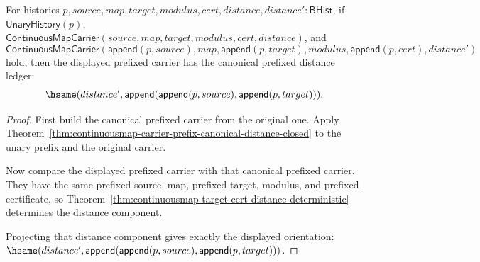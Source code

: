 \begin{theorem}
\label{thm:continuousmap-prefix-canonical-distance-determinacy}
For histories $p,source,map,target,modulus,cert,distance,distance':\mathsf{BHist}$,
if $\mathsf{UnaryHistory}(p)$,
$\mathsf{ContinuousMapCarrier}(source,map,target,modulus,cert,distance)$, and
$$
\mathsf{ContinuousMapCarrier}
(\mathsf{append}(p,source),map,\mathsf{append}(p,target),modulus,
\mathsf{append}(p,cert),distance')
$$
hold, then the displayed prefixed carrier has the canonical prefixed distance
ledger:
$$
\hsame(distance',
\mathsf{append}(\mathsf{append}(p,source),\mathsf{append}(p,target))).
$$
\end{theorem}
\begin{proof}
First build the canonical prefixed carrier from the original one. Apply
Theorem~\ref{thm:continuousmap-carrier-prefix-canonical-distance-closed} to
the unary prefix and the original carrier.

Now compare the displayed prefixed carrier with that canonical prefixed
carrier. They have the same prefixed source, map, prefixed target, modulus, and
prefixed certificate, so
Theorem~\ref{thm:continuousmap-target-cert-distance-deterministic} determines
the distance component.

Projecting that distance component gives exactly the displayed orientation:
$\hsame(distance',
\mathsf{append}(\mathsf{append}(p,source),\mathsf{append}(p,target)))$.
\end{proof}

